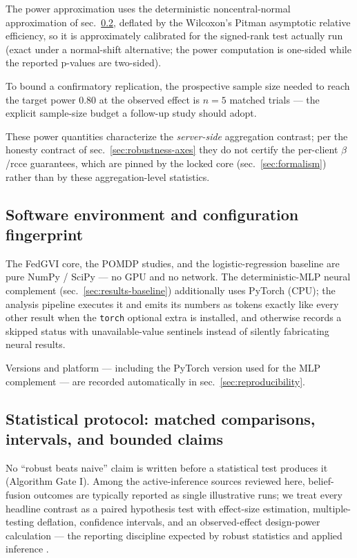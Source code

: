 \documentclass[
  english,
]{article}
\theoremstyle{plain}
\theoremstyle{definition}
\theoremstyle{remark}
\theoremstyle{definition}
\begin{document}
The power approximation uses the deterministic noncentral-normal
approximation of sec.~\ref{sec:methods-statistics}, deflated by the
Wilcoxon's Pitman asymptotic relative efficiency, so it is approximately
calibrated for the signed-rank test actually run (exact under a
normal-shift alternative; the power computation is one-sided while the
reported p-values are two-sided).

To bound a confirmatory replication, the prospective sample size needed
to reach the target power 0.80 at the observed effect is \(n = 5\)
matched trials --- the explicit sample-size budget a follow-up study
should adopt.

These power quantities characterize the \emph{server-side} aggregation
contrast; per the honesty contract of sec.~\ref{sec:robustness-axes}
they do not certify the per-client \(\beta\)/rcce guarantees, which are
pinned by the locked core (sec.~\ref{sec:formalism}) rather than by
these aggregation-level statistics.

\subsection{Software environment and configuration
fingerprint}\label{sec:methods-software}

The FedGVI core, the POMDP studies, and the logistic-regression baseline
are pure NumPy / SciPy --- no GPU and no network. The deterministic-MLP
neural complement (sec.~\ref{sec:results-baseline}) additionally uses
PyTorch (CPU); the analysis pipeline executes it and emits its numbers
as tokens exactly like every other result when the \texttt{torch}
optional extra is installed, and otherwise records a skipped status with
unavailable-value sentinels instead of silently fabricating neural
results.

Versions and platform --- including the PyTorch version used for the MLP
complement --- are recorded automatically in
sec.~\ref{sec:reproducibility}.

\subsection{Statistical protocol: matched comparisons, intervals, and
bounded claims}\label{sec:methods-statistics}

No ``robust beats naive'' claim is written before a statistical test
produces it (Algorithm Gate I). Among the active-inference sources
reviewed here, belief-fusion outcomes are typically reported as single
illustrative runs; we treat every headline contrast as a paired
hypothesis test with effect-size estimation, multiple-testing deflation,
confidence intervals, and an observed-effect design-power calculation
--- the reporting discipline expected by robust statistics and applied
inference
\citep{huber2009robust, efron1993bootstrap, koehler2009mcse, morris2019simulation, loy2021lmeresampler, nakagawa2007effect, benjamini1995controlling, wasserstein2016asa}.
\end{document}
